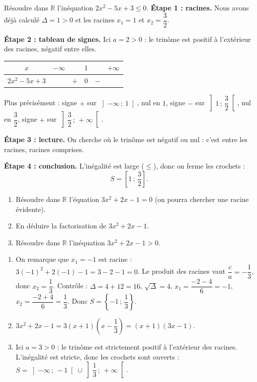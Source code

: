 \documentclass[11pt]{article}
\begin{document}
\begin{exoresolu}
Résoudre dans $\mathbb{R}$ l'inéquation $2x^2 - 5x + 3 \leq 0$.
\tcblower
\textbf{Étape 1 : racines.} Nous avons déjà calculé $\Delta = 1 > 0$ et les racines $x_1 = 1$ et $x_2 = \dfrac{3}{2}$.

\textbf{Étape 2 : tableau de signes.} Ici $a = 2 > 0$ : le trinôme est positif à l'extérieur des racines, négatif entre elles.
\begin{center}
\begin{tabular}{|c|ccccc|}\hline
$x$ & $-\infty$ & & $1$ & & $+\infty$ \\ \hline
$2x^2 - 5x + 3$ & & $+$ & $0$ & $-$ & \\ \hline
\end{tabular}
\end{center}
Plus précisément : signe $+$ sur $\left]-\infty\,;\,1\right[$, nul en $1$, signe $-$ sur $\left]1\,;\,\dfrac{3}{2}\right[$, nul en $\dfrac{3}{2}$, signe $+$ sur $\left]\dfrac{3}{2}\,;\,+\infty\right[$.

\textbf{Étape 3 : lecture.} On cherche où le trinôme est négatif ou nul : c'est entre les racines, racines comprises.

\textbf{Étape 4 : conclusion.} L'inégalité est large ($\leq$), donc on ferme les crochets :
\[ S = \left[1\,;\,\frac{3}{2}\right]. \]
\end{exoresolu}

\begin{exercice}
\begin{enumerate}
\item Résoudre dans $\mathbb{R}$ l'équation $3x^2 + 2x - 1 = 0$ (on pourra chercher une racine évidente).
\item En déduire la factorisation de $3x^2 + 2x - 1$.
\item Résoudre dans $\mathbb{R}$ l'inéquation $3x^2 + 2x - 1 > 0$.
\end{enumerate}
\end{exercice}

\begin{corrige}[Exercice 1]
\begin{enumerate}
\item On remarque que $x_1 = -1$ est racine : $3(-1)^2 + 2(-1) - 1 = 3 - 2 - 1 = 0$. Le produit des racines vaut $\dfrac{c}{a} = -\dfrac{1}{3}$, donc $x_2 = \dfrac{1}{3}$. Contrôle : $\Delta = 4 + 12 = 16$, $\sqrt{\Delta} = 4$, $x_1 = \dfrac{-2-4}{6} = -1$, $x_2 = \dfrac{-2+4}{6} = \dfrac{1}{3}$. Donc $S = \left\{-1\,;\,\dfrac{1}{3}\right\}$.
\item $3x^2 + 2x - 1 = 3(x + 1)\left(x - \dfrac{1}{3}\right) = (x + 1)(3x - 1)$.
\item Ici $a = 3 > 0$ : le trinôme est strictement positif à l'extérieur des racines. L'inégalité est stricte, donc les crochets sont ouverts : $S = \left]-\infty\,;\,-1\right[ \cup \left]\dfrac{1}{3}\,;\,+\infty\right[$.
\end{enumerate}
\end{corrige}
\end{document}
